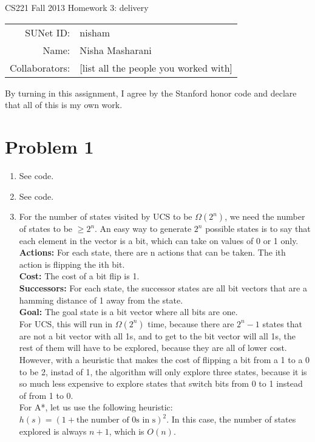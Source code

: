 \documentclass[12pt]{article}
\begin{document}
\begin{center}
{\Large CS221 Fall 2013 Homework 3: delivery}

\begin{tabular}{rl}
SUNet ID: & nisham \\
Name: & Nisha Masharani \\
Collaborators: & [list all the people you worked with]
\end{tabular}
\end{center}

By turning in this assignment, I agree by the Stanford honor code and declare
that all of this is my own work.

\section*{Problem 1}

\begin{enumerate}[label=(\alph*)]
  \item See code.
  \item See code.
  \item For the number of states visited by UCS to be $\Omega(2^n)$, we need the number of states to be $\ge 2^n$. An easy way to generate $2^n$ possible states is to say that each element in the vector is a bit, which can take on values of 0 or 1 only.\\
  \textbf{Actions:} For each state, there are n actions that can be taken. The ith action is flipping the ith bit.\\
  \textbf{Cost:} The cost of a bit flip is 1.\\
  \textbf{Successors:} For each state, the successor states are all bit vectors that are a hamming distance of 1 away from the state.\\
  \textbf{Goal:} The goal state is a bit vector where all bits are one.\\
  For UCS, this will run in $\Omega(2^n)$ time, because there are $2^n-1$ states that are not a bit vector with all 1s, and to get to the bit vector will all 1s, the rest of them will have to be explored, because they are all of lower cost. However, with a heuristic that makes the cost of flipping a bit from a 1 to a 0 to be 2, instad of 1, the algorithm will only explore three states, because it is so much less expensive to explore states that switch bits from 0 to 1 instead of from 1 to 0.\\
  For A*, let us use the following heuristic: $h(s) = (1 + \text{the number of 0s in s})^2$. In this case, the number of states explored is always $n+1$, which is $O(n)$.
\end{enumerate}
\end{document}
